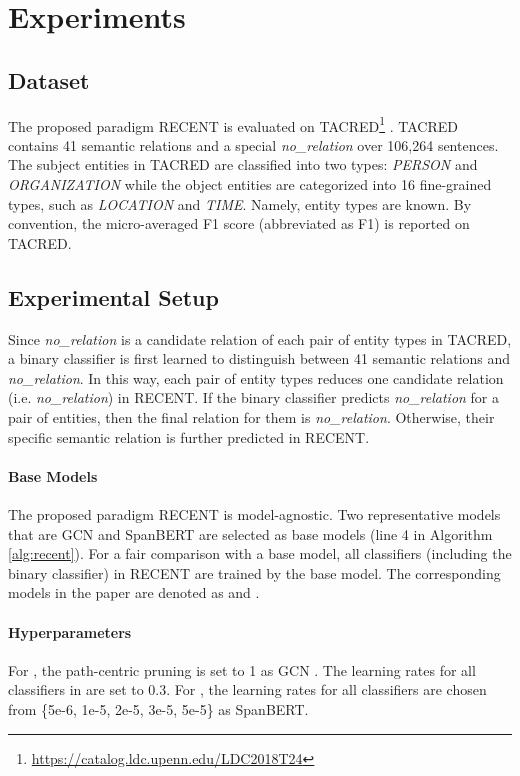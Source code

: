\documentclass[11pt,a4paper]{article}
\begin{document}
\section{Experiments}
\subsection{Dataset} 
The proposed paradigm RECENT is evaluated on TACRED\footnote{\url{https://catalog.ldc.upenn.edu/LDC2018T24}} \cite{zhang-etal-2017-position}. 
TACRED contains 41 semantic relations and a special \textit{no\_relation} over 106,264 sentences. 
The subject entities in TACRED are classified  into two types: \textit{PERSON} and \textit{ORGANIZATION} 
while the object entities are categorized into 16 fine-grained types, such as \textit{LOCATION } and \textit{TIME}.
Namely, entity types are known.
By convention, the micro-averaged F1 score (abbreviated as F1) is reported on TACRED.

\subsection{Experimental Setup}


Since \textit{no\_relation}  is a candidate relation of  each pair of entity types in TACRED, 
a binary classifier is first learned to distinguish between 41 semantic relations and \textit{no\_relation}.
In this way, each pair of entity types reduces one candidate relation (i.e. \textit{no\_relation}) in RECENT.
If the binary classifier predicts \textit{no\_relation} for a pair of entities, then the final relation for them is \textit{no\_relation}.
Otherwise, their specific semantic relation is further predicted in  RECENT.  


\paragraph{Base Models} The proposed paradigm RECENT is model-agnostic. 
Two representative models 
that are GCN \cite{zhang-etal-2018-graph} and SpanBERT \cite{joshi-etal-2020-spanbert} 
are selected as base models (line 4 in Algorithm \ref{alg:recent}). 
For a fair comparison with a base model, 
all classifiers (including the binary classifier) in RECENT are trained by the base model. 
The corresponding models in the paper are denoted as  and 	
.

\paragraph{Hyperparameters}
For , the path-centric pruning  is set to 1 as GCN \cite{zhang-etal-2018-graph}.
The learning rates for all classifiers in  are set to 0.3. 
For , the learning rates for all classifiers are chosen from \{5e-6, 1e-5, 2e-5, 3e-5, 5e-5\} as SpanBERT.
\end{document}
